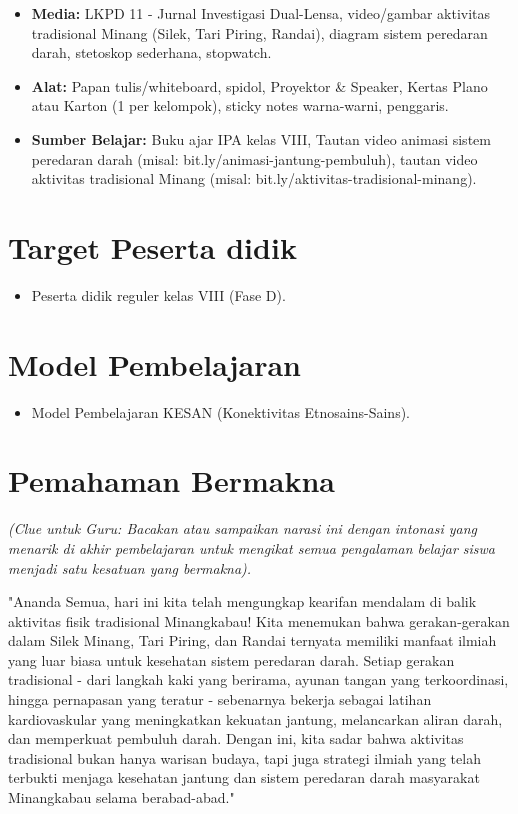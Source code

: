 \documentclass[a4paper,12pt]{article}
\begin{document}
\begin{itemize}
\item \textbf{Media:} LKPD 11 - Jurnal Investigasi Dual-Lensa, video/gambar aktivitas tradisional Minang (Silek, Tari Piring, Randai), diagram sistem peredaran darah, stetoskop sederhana, stopwatch.
\item \textbf{Alat:} Papan tulis/whiteboard, spidol, Proyektor \& Speaker, Kertas Plano atau Karton (1 per kelompok), sticky notes warna-warni, penggaris.
\item \textbf{Sumber Belajar:} Buku ajar IPA kelas VIII, Tautan video animasi sistem peredaran darah (misal: bit.ly/animasi-jantung-pembuluh), tautan video aktivitas tradisional Minang (misal: bit.ly/aktivitas-tradisional-minang).
\end{itemize}

\section{Target Peserta didik}

\begin{itemize}
\item Peserta didik reguler kelas VIII (Fase D).
\end{itemize}

\section{Model Pembelajaran}

\begin{itemize}
\item Model Pembelajaran KESAN (Konektivitas Etnosains-Sains).
\end{itemize}

\section{Pemahaman Bermakna}
\textit{(Clue untuk Guru: Bacakan atau sampaikan narasi ini dengan intonasi yang menarik di akhir pembelajaran untuk mengikat semua pengalaman belajar siswa menjadi satu kesatuan yang bermakna).}

\begin{tcolorbox}[sectionbox]
"Ananda Semua, hari ini kita telah mengungkap kearifan mendalam di balik aktivitas fisik tradisional Minangkabau! Kita menemukan bahwa gerakan-gerakan dalam Silek Minang, Tari Piring, dan Randai ternyata memiliki manfaat ilmiah yang luar biasa untuk kesehatan sistem peredaran darah. Setiap gerakan tradisional - dari langkah kaki yang berirama, ayunan tangan yang terkoordinasi, hingga pernapasan yang teratur - sebenarnya bekerja sebagai latihan kardiovaskular yang meningkatkan kekuatan jantung, melancarkan aliran darah, dan memperkuat pembuluh darah. Dengan ini, kita sadar bahwa aktivitas tradisional bukan hanya warisan budaya, tapi juga strategi ilmiah yang telah terbukti menjaga kesehatan jantung dan sistem peredaran darah masyarakat Minangkabau selama berabad-abad."
\end{tcolorbox}
\end{document}
